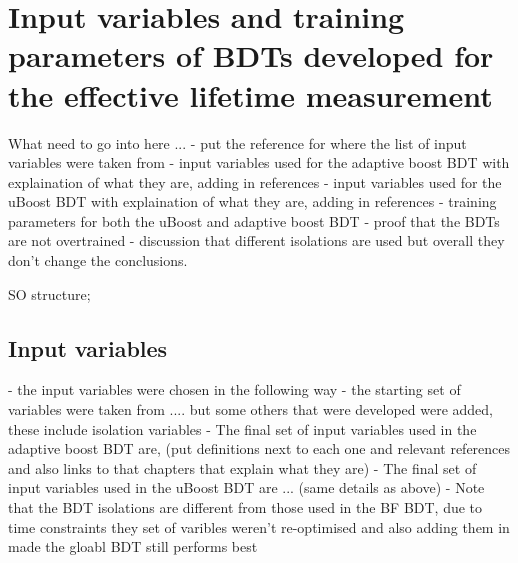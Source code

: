 \chapter{Input variables and training parameters of BDTs developed for the effective lifetime measurement}
\label{sec:appendix2}
What need to go into here ...
- put the reference for where the list of input variables were taken from
- input variables used for the adaptive boost BDT with explaination of what they are, adding in references
- input variables used for the uBoost BDT with explaination of what they are, adding in references
- training parameters for both the uBoost and adaptive boost BDT
- proof that the BDTs are not overtrained
- discussion that different isolations are used but overall they don't change the conclusions.


SO structure;
\section{Input variables}
- the input variables were chosen in the following way
- the starting set of variables were taken from .... but some others that were developed were added, these include isolation variables
- The final set of input variables used in the adaptive boost BDT are, (put definitions next to each one and relevant references and also links to that chapters that explain what they are)
- The final set of input variables used in the uBoost BDT are ... (same details as above)
- Note that the BDT isolations are different from those used in the BF BDT, due to time constraints they set of varibles weren't re-optimised and also adding them in made the gloabl BDT still performs best


